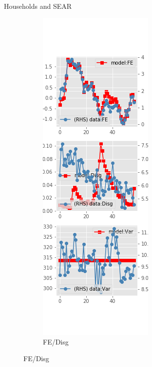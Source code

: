 \documentclass{beamer}
\begin{document}
\begin{frame}{Households and SEAR}
\begin{figure}[ht]
\begin{subfigure}[b]{0.2\textwidth}
		\end{subfigure}
		\hfill
		\begin{subfigure}[b]{0.2\textwidth}
			\caption{FE/Disg}
			\includegraphics[width=\textwidth, height = 0.8\textheight]{figuresDraft/sce_se_est_diag2.png}

\end{subfigure}
\end{figure}
\end{frame}
\end{document}
